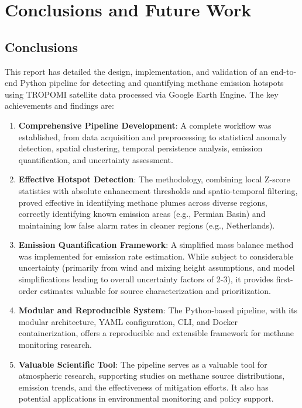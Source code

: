 \documentclass[12pt,a4paper]{article}
\begin{document}
\section{Conclusions and Future Work}
\label{sec:conclusions_future}

\subsection{Conclusions}
This report has detailed the design, implementation, and validation of an end-to-end Python pipeline for detecting and quantifying methane emission hotspots using TROPOMI satellite data processed via Google Earth Engine. The key achievements and findings are:
\begin{enumerate}
    \item \textbf{Comprehensive Pipeline Development}: A complete workflow was established, from data acquisition and preprocessing to statistical anomaly detection, spatial clustering, temporal persistence analysis, emission quantification, and uncertainty assessment.
    \item \textbf{Effective Hotspot Detection}: The methodology, combining local Z-score statistics with absolute enhancement thresholds and spatio-temporal filtering, proved effective in identifying methane plumes across diverse regions, correctly identifying known emission areas (e.g., Permian Basin) and maintaining low false alarm rates in cleaner regions (e.g., Netherlands).
    \item \textbf{Emission Quantification Framework}: A simplified mass balance method was implemented for emission rate estimation. While subject to considerable uncertainty (primarily from wind and mixing height assumptions, and model simplifications leading to overall uncertainty factors of 2-3), it provides first-order estimates valuable for source characterization and prioritization.
    \item \textbf{Modular and Reproducible System}: The Python-based pipeline, with its modular architecture, YAML configuration, CLI, and Docker containerization, offers a reproducible and extensible framework for methane monitoring research.
    \item \textbf{Valuable Scientific Tool}: The pipeline serves as a valuable tool for atmospheric research, supporting studies on methane source distributions, emission trends, and the effectiveness of mitigation efforts. It also has potential applications in environmental monitoring and policy support.
\end{enumerate}
\end{document}
